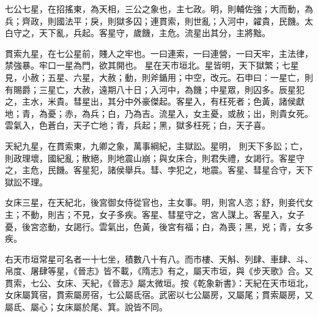 \begin{pinyinscope}
 七公七星，在招搖東，為天相，三公之象也，主七政。明，則輔佐強；大而動，為兵；齊政，則國法平；戾，則獄多囚；連貫索，則世亂；入河中，糴貴，民饑。太白守之，天下亂，兵起。客星守，歲饑，主危。流星出其分，主將黜。



 貫索九星，在七公星前，賤人之牢也。一曰連索，一曰連營，一曰天牢，主法律，禁強暴。牢口一星為門，欲其開也。
 星在天市垣北。星皆明，天下獄繁；七星見，小赦；五星、六星，大赦；動，則斧鍎用；中空，改元。石申曰：一星亡，則有賜爵；三星亡，大赦，遠期八十日；入河中，為饑；中星眾，則囚多。辰星犯之，主水，米貴。彗星出，其分中外豪傑起。客星入，有枉死者；色黃，諸侯獻地；青，為憂；赤，為兵；白，乃為吉。流星入，女主憂，或赦；出，則貴女死。雲氣入，色蒼白，天子亡地；青，兵起；黑，獄多枉死；白，天子喜。



 天紀九星，在貫索東，九卿之象，萬事綱紀，主獄訟。星明，
 則天下多訟；亡，則政理壞，國紀亂；散絕，則地震山崩；與女床合，則君失禮，女謁行。客星守之，主危，民饑。客星犯，諸侯舉兵。彗、孛犯之，地震。客星、彗星合守，天下獄訟不理。



 女床三星，在天紀北，後宮御女侍從官也，主女事。明，則宮人恣；舒，則妾代女主；不動，則吉；不見，女子多疾。客星、彗星守之，宮人謀上。客星入，女子憂，後宮恣動，女謁行。雲氣出，色黃，後宮有福；白，為喪；黑，兇；青，女多疾。



 右天市垣常星可名者一十七坐，積數八十有八。而市樓、天斛、列肆、車肆、斗、帛度、屠肆等星，《晉志》皆不載，《隋志》有之，屬天市垣，與《步天歌》合。又貫索，七公、女床、天紀，《晉志》屬太微垣。按《乾象新書》：天紀在天市垣北，女床屬箕宿，貫索屬房宿，七公屬氐宿。武密以七公屬房，又屬尾；貫索屬房，又屬氐、屬心；女床屬於尾、箕。說皆不同。



\end{pinyinscope}